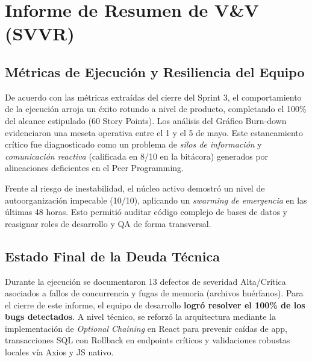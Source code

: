 \clearpage
\section{Informe de Resumen de V\&V (SVVR)}
\label{sec:svvr_sp3}

\subsection{Métricas de Ejecución y Resiliencia del Equipo}
De acuerdo con las métricas extraídas del cierre del Sprint 3, el comportamiento de la ejecución arroja un éxito rotundo a nivel de producto, completando el 100\% del alcance estipulado (60 Story Points). Los análisis del Gráfico Burn-down evidenciaron una meseta operativa entre el 1 y el 5 de mayo. Este estancamiento crítico fue diagnosticado como un problema de \textit{silos de información} y \textit{comunicación reactiva} (calificada en 8/10 en la bitácora) generados por alineaciones deficientes en el Peer Programming.

Frente al riesgo de inestabilidad, el núcleo activo demostró un nivel de autoorganización impecable (10/10), aplicando un \textit{swarming de emergencia} en las últimas 48 horas. Esto permitió auditar código complejo de bases de datos y reasignar roles de desarrollo y QA de forma transversal.

\subsection{Estado Final de la Deuda Técnica}
Durante la ejecución se documentaron 13 defectos de severidad Alta/Crítica asociados a fallos de concurrencia y fugas de memoria (archivos huérfanos). Para el cierre de este informe, el equipo de desarrollo \textbf{logró resolver el 100\% de los bugs detectados}. A nivel técnico, se reforzó la arquitectura mediante la implementación de \textit{Optional Chaining} en React para prevenir caídas de app, transacciones SQL con Rollback en endpoints críticos y validaciones robustas locales vía Axios y JS nativo.

